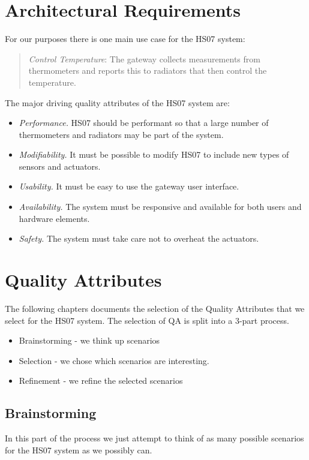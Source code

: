 \documentclass[a4paper,10pt]{article}
\begin{document}
\section{Architectural Requirements}
\label{sec:requirements}

For our purposes there is one main use case for the HS07 system:
\begin{quote}
  \emph{Control Temperature}: The gateway collects measurements from
  thermometers and reports this to radiators that then control the
  temperature.
\end{quote}

The major driving quality attributes of the HS07 system
are:

\begin{itemize}
\item \emph{Performance.} HS07 should be performant so that a large
  number of thermometers and radiators may be part of the system.
\item \emph{Modifiability.} It must be possible to modify HS07 to
  include new types of sensors and actuators.
\item \emph{Usability.} It must be easy to use the gateway user interface.
\item \emph{Availability.} The system must be responsive and available for 
both users and hardware elements.
\item \emph{Safety.} The system must take care not to overheat the actuators.
\end{itemize}


\section{Quality Attributes}
The following chapters documents the selection of the Quality Attributes that we 
select for the HS07 system. The selection of QA is split into a 3-part process.
\begin{itemize}
\item Brainstorming - we think up scenarios
\item Selection - we chose which scenarios are interesting.
\item Refinement - we refine the selected scenarios
\end{itemize}
\subsection{Brainstorming}
In this part of the process we just attempt to think of as many possible scenarios for the HS07 system as we possibly can. 
\end{document}
